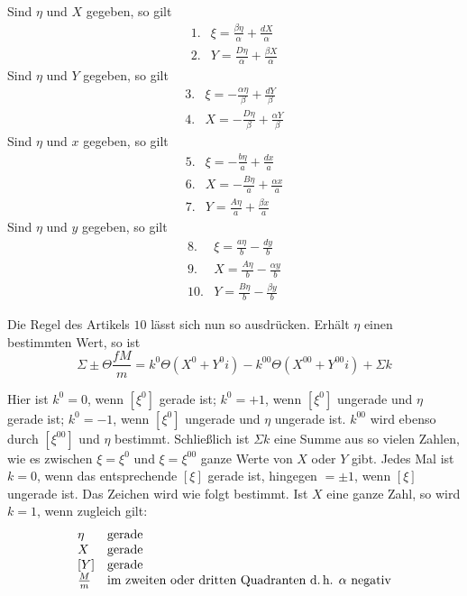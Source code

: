 Sind $\eta$ und $X$ gegeben, so gilt
\[
\begin{array}{rl}
1.&\xi=\frac{\beta\eta}{\alpha}+\frac{dX}{\alpha}\\[3pt]
2.&Y=\frac{D\eta}{\alpha}+\frac{\beta X}{\alpha}
\end{array}
\]
Sind $\eta$ und $Y$ gegeben, so gilt
\[
\begin{array}{rl}
3.&\xi=-\frac{\alpha\eta}{\beta}+\frac{dY}{\beta}\\[3pt]
4.&X=-\frac{D\eta}{\beta}+\frac{\alpha Y}{\beta}
\end{array}
\]
Sind $\eta$ und $x$ gegeben, so gilt
\[
\begin{array}{rl}
5.&\xi=-\frac{b\eta}{a}+\frac{dx}{a}\\[3pt]
6.&X=-\frac{B\eta}{a}+\frac{\alpha x}{a}\\[3pt]
7.&Y=\frac{A\eta}{a}+\frac{\beta x}{a}
\end{array}
\]
Sind $\eta$ und $y$ gegeben, so gilt
\[
\begin{array}{rl}
8.&\xi=\frac{a\eta}{b}-\frac{dy}{b}\\[3pt]
9.&X=\frac{A\eta}{b}-\frac{\alpha y}{b}\\[3pt]
10.&Y=\frac{B\eta}{b}-\frac{\beta y}{b}
\end{array}
\]

Die Regel des Artikels $10$ lässt sich nun so ausdrücken. Erhält $\eta$ einen bestimmten Wert, so ist
\[
\Sigma\pm\Theta\frac{fM}{m}=k^0\Theta(X^0+Y^0i)-k^{00}\Theta(X^{00}+Y^{00}i)+\Sigma k
\]

Hier ist $k^0=0$, wenn $[\xi^0]$ gerade ist; $k^0=+1$, wenn $[\xi^0]$ ungerade und $\eta$ gerade ist; $k^0=-1$, wenn $[\xi^0]$ ungerade und $\eta$ ungerade ist. $k^{00}$ wird ebenso durch $[\xi^{00}]$ und $\eta$ bestimmt. Schließlich ist $\Sigma k$ eine Summe aus so vielen Zahlen, wie es zwischen $\xi=\xi^0$ und $\xi=\xi^{00}$ ganze Werte von $X$ oder $Y$ gibt. Jedes Mal ist $k=0$, wenn das entsprechende $[\xi]$ gerade ist, hingegen $=\pm1$, wenn $[\xi]$ ungerade ist. Das Zeichen wird wie folgt bestimmt. Ist $X$ eine ganze Zahl, so wird $k=1$, wenn zugleich gilt:
\[
\begin{array}{ll}
\eta&\text{gerade}\\
X&\text{gerade}\\
\relax[Y]&\text{gerade}\\
\frac{M}{m}&\text{im zweiten oder dritten Quadranten d.\,h. }\alpha\text{ negativ}
\end{array}
\]

